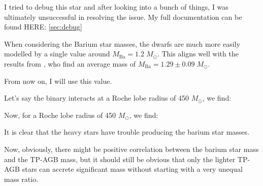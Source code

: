 \documentclass[a4paper,10pt]{article}
\begin{document}
I tried to debug this star and after looking into a bunch of things, I was ultimately unsuccessful in resolving the issue. My full documentation can be found HERE: \ref{sec:debug}
\begin{figure}[ht]
    \centering
\end{figure}

\begin{figure}[ht]
    \centering
\end{figure}

When considering the Barium star masses, the dwarfs are much more easily modelled by a single value around \(M_\text{Ba} = 1.2\; M_\odot \).
This aligns well with the results from \citet{sarmah2026}, who find an average mass of \(M_\text{Ba} = 1.29\pm 0.09\;M_\odot \).

From now on, I will use this value.

Let's say the binary interacts at a Roche lobe radius of 450 \(M_\odot \), we find:
\begin{figure}[ht]
    \centering
\end{figure}

\begin{figure}[ht]
    \centering
\end{figure}

\begin{figure}[ht]
    \centering
\end{figure}

Now, for a Roche lobe radius of 450 \(M_\odot \), we find:

\begin{figure}[ht]
    \centering
\end{figure}

\begin{figure}[ht]
    \centering
\end{figure}

\begin{figure}[ht]
    \centering
\end{figure}

It is clear that the heavy stars have trouble producing the barium star masses.

Now, obviously, there might be positive correlation between the barium star mass and the TP-AGB mass, but it should still be obvious that only the lighter TP-AGB stars can accrete significant mass without starting with a very unequal mass ratio.
\end{document}
